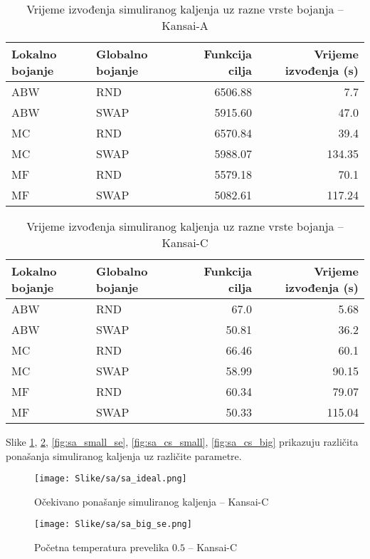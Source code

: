 \documentclass[times, utf8, diplomski, numeric]{fer}
\begin{document}
\begin{table}[htb]
	\caption{Vrijeme izvođenja simuliranog kaljenja uz razne vrste bojanja -- Kansai-A}
	\label{tbl:sa-cs3}
	\centering
	\begin{tabular}{|l||l|r|r|} \hline
	Lokalno bojanje & Globalno bojanje & Funkcija cilja & Vrijeme izvođenja (s)\\ \hline \hline
	ABW & RND & 6506.88 & 7.7 \\ \hline 
	ABW & SWAP & 5915.60 & 47.0 \\  \hline
	MC & RND & 6570.84 & 39.4 \\ \hline
	MC & SWAP & 5988.07 & 134.35 \\  \hline 
	MF & RND & 5579.18 & 70.1 \\ \hline
	MF & SWAP & 5082.61 & 117.24 \\ \hline
	\end{tabular}
\end{table}

\begin{table}[htb]
	\caption{Vrijeme izvođenja simuliranog kaljenja uz razne vrste bojanja -- Kansai-C}
	\label{tbl:sa-cs4}
	\centering
	\begin{tabular}{|l||l|r|r|} \hline
	Lokalno bojanje & Globalno bojanje & Funkcija cilja & Vrijeme izvođenja (s)\\ \hline \hline
	ABW & RND & 67.0 & 5.68 \\ \hline 
	ABW & SWAP & 50.81 & 36.2 \\  \hline
	MC & RND & 66.46 & 60.1 \\ \hline
	MC & SWAP & 58.99 &  90.15 \\  \hline 
	MF & RND & 60.34 & 79.07 \\ \hline
	MF & SWAP & 50.33 & 115.04 \\ \hline
	\end{tabular}
\end{table}

Slike \ref{fig:sa_ideal}, \ref{fig:sa_big_se}, \ref{fig:sa_small_se}, \ref{fig:sa_cs_small}, \ref{fig:sa_cs_big} prikazuju različita ponašanja simuliranog kaljenja uz različite parametre. 

\begin{figure}[htb]
	\texttt{[image: Slike/sa/sa\_ideal.png]}
	\caption{Očekivano ponašanje simuliranog kaljenja -- Kansai-C}
	\label{fig:sa_ideal}
\end{figure}

\begin{figure}[htb]
	\texttt{[image: Slike/sa/sa\_big\_se.png]}
	\caption{Početna temperatura prevelika $0.5$ -- Kansai-C}
	\label{fig:sa_big_se}
\end{figure}
\end{document}
